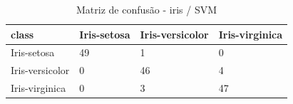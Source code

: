 \begin{table}[htbp]
\centering
\begin{tabular}{llll}
\hline
class & Iris-setosa & Iris-versicolor & Iris-virginica \\
\hline
Iris-setosa & 49 & 1 & 0 \\
Iris-versicolor & 0 & 46 & 4 \\
Iris-virginica & 0 & 3 & 47 \\
\hline
\end{tabular}
\caption{Matriz de confusão - iris / SVM}
\label{tab:ex3-iris-svm-cm}
\end{table}